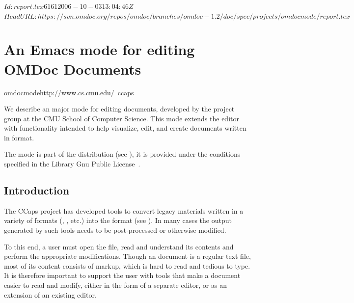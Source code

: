 \svnInfo $Id: report.tex 6161 2006-10-03 13:04:46Z  $
\svnKeyword $HeadURL: https://svn.omdoc.org/repos/omdoc/branches/omdoc-1.2/doc/spec/projects/omdocmode/report.tex $

\section{An Emacs mode for editing OMDoc Documents}
\begin{project}{omdocmode}{http://www.cs.cmu.edu/~ccaps}
\end{project}

We describe an {\emacs} major mode for editing {\omdoc} documents, developed by the {}
project group at the CMU School of Computer Science.  This mode extends the {\emacs}
editor~\cite{Stallman:em02} with functionality intended to help visualize, edit, and
create documents written in {\omdoc} format.

The mode is part of the {\omdoc} distribution (see {}), it is
provided under the conditions specified in the Library Gnu Public License~\cite{LGPL}.

\subsection{Introduction}

The CCaps project has developed tools to convert legacy materials written in a variety of
formats ({}, {\mathematica}, etc.)  into the {\omdoc} format (see
{}). In many cases the output generated by such tools needs to
be post-processed or otherwise modified.

To this end, a user must open the file, read and understand its contents and perform the
appropriate modifications.  Though an {\omdoc} document is a regular text file, most of
its content consists of markup, which is hard to read and tedious to type.  It is
therefore important to support the user with tools that make a document easier to read and
modify, either in the form of a separate editor, or as an extension of an existing editor.


